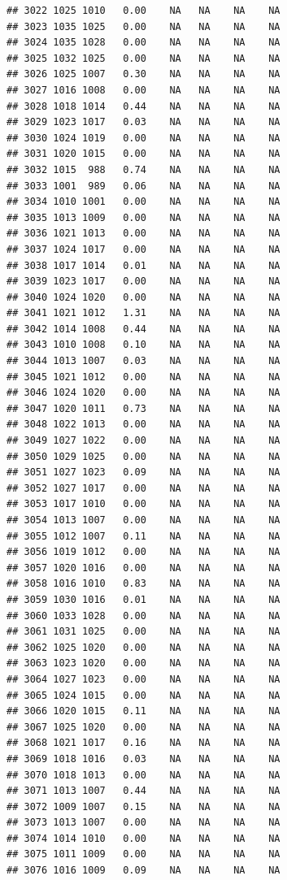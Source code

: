 \documentclass{article}\usepackage{graphicx, color}
\makeatletter
\newenvironment{kframe}{%
 \def\at@end@of@kframe{}%
 \ifinner\ifhmode%
  \def\at@end@of@kframe{\end{minipage}}%
  \begin{minipage}{\columnwidth}%
 \fi\fi%
 \def\FrameCommand##1{\hskip\@totalleftmargin \hskip-\fboxsep
 \colorbox{shadecolor}{##1}\hskip-\fboxsep
     \hskip-\linewidth \hskip-\@totalleftmargin \hskip\columnwidth}%
 \MakeFramed {\advance\hsize-\width
   \@totalleftmargin\z@ \linewidth\hsize
   \@setminipage}}%
 {\par\unskip\endMakeFramed%
 \at@end@of@kframe}
\newenvironment{knitrout}{}{} %
\makeatother
\begin{document}
\begin{knitrout}
\begin{kframe}
\begin{verbatim}
## 3022 1025 1010   0.00    NA   NA    NA    NA
## 3023 1035 1025   0.00    NA   NA    NA    NA
## 3024 1035 1028   0.00    NA   NA    NA    NA
## 3025 1032 1025   0.00    NA   NA    NA    NA
## 3026 1025 1007   0.30    NA   NA    NA    NA
## 3027 1016 1008   0.00    NA   NA    NA    NA
## 3028 1018 1014   0.44    NA   NA    NA    NA
## 3029 1023 1017   0.03    NA   NA    NA    NA
## 3030 1024 1019   0.00    NA   NA    NA    NA
## 3031 1020 1015   0.00    NA   NA    NA    NA
## 3032 1015  988   0.74    NA   NA    NA    NA
## 3033 1001  989   0.06    NA   NA    NA    NA
## 3034 1010 1001   0.00    NA   NA    NA    NA
## 3035 1013 1009   0.00    NA   NA    NA    NA
## 3036 1021 1013   0.00    NA   NA    NA    NA
## 3037 1024 1017   0.00    NA   NA    NA    NA
## 3038 1017 1014   0.01    NA   NA    NA    NA
## 3039 1023 1017   0.00    NA   NA    NA    NA
## 3040 1024 1020   0.00    NA   NA    NA    NA
## 3041 1021 1012   1.31    NA   NA    NA    NA
## 3042 1014 1008   0.44    NA   NA    NA    NA
## 3043 1010 1008   0.10    NA   NA    NA    NA
## 3044 1013 1007   0.03    NA   NA    NA    NA
## 3045 1021 1012   0.00    NA   NA    NA    NA
## 3046 1024 1020   0.00    NA   NA    NA    NA
## 3047 1020 1011   0.73    NA   NA    NA    NA
## 3048 1022 1013   0.00    NA   NA    NA    NA
## 3049 1027 1022   0.00    NA   NA    NA    NA
## 3050 1029 1025   0.00    NA   NA    NA    NA
## 3051 1027 1023   0.09    NA   NA    NA    NA
## 3052 1027 1017   0.00    NA   NA    NA    NA
## 3053 1017 1010   0.00    NA   NA    NA    NA
## 3054 1013 1007   0.00    NA   NA    NA    NA
## 3055 1012 1007   0.11    NA   NA    NA    NA
## 3056 1019 1012   0.00    NA   NA    NA    NA
## 3057 1020 1016   0.00    NA   NA    NA    NA
## 3058 1016 1010   0.83    NA   NA    NA    NA
## 3059 1030 1016   0.01    NA   NA    NA    NA
## 3060 1033 1028   0.00    NA   NA    NA    NA
## 3061 1031 1025   0.00    NA   NA    NA    NA
## 3062 1025 1020   0.00    NA   NA    NA    NA
## 3063 1023 1020   0.00    NA   NA    NA    NA
## 3064 1027 1023   0.00    NA   NA    NA    NA
## 3065 1024 1015   0.00    NA   NA    NA    NA
## 3066 1020 1015   0.11    NA   NA    NA    NA
## 3067 1025 1020   0.00    NA   NA    NA    NA
## 3068 1021 1017   0.16    NA   NA    NA    NA
## 3069 1018 1016   0.03    NA   NA    NA    NA
## 3070 1018 1013   0.00    NA   NA    NA    NA
## 3071 1013 1007   0.44    NA   NA    NA    NA
## 3072 1009 1007   0.15    NA   NA    NA    NA
## 3073 1013 1007   0.00    NA   NA    NA    NA
## 3074 1014 1010   0.00    NA   NA    NA    NA
## 3075 1011 1009   0.00    NA   NA    NA    NA
## 3076 1016 1009   0.09    NA   NA    NA    NA

\end{verbatim}
\end{kframe}
\end{knitrout}
\end{document}
